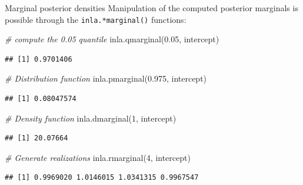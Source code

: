 \documentclass[
  ignorenonframetext,
]{beamer}
\newenvironment{Shaded}{\begin{snugshade}}{\end{snugshade}}
\newcommand{\CommentTok}[1]{\textcolor[rgb]{0.56,0.35,0.01}{\textit{#1}}}
\newcommand{\DecValTok}[1]{\textcolor[rgb]{0.00,0.00,0.81}{#1}}
\newcommand{\FloatTok}[1]{\textcolor[rgb]{0.00,0.00,0.81}{#1}}
\newcommand{\FunctionTok}[1]{\textcolor[rgb]{0.00,0.00,0.00}{#1}}
\newcommand{\NormalTok}[1]{#1}
\begin{document}
\begin{frame}[fragile]{Marginal posterior densities}
\protect\hypertarget{marginal-posterior-densities-2}{}
Manipulation of the computed posterior marginals is possible through the
\texttt{inla.*marginal()} functions:

\small

\begin{Shaded}
\begin{Highlighting}[]
\CommentTok{\# compute the 0.05 quantile}
\FunctionTok{inla.qmarginal}\NormalTok{(}\FloatTok{0.05}\NormalTok{, intercept)}
\end{Highlighting}
\end{Shaded}

\begin{verbatim}
## [1] 0.9701406
\end{verbatim}

\begin{Shaded}
\begin{Highlighting}[]
\CommentTok{\# Distribution function}
\FunctionTok{inla.pmarginal}\NormalTok{(}\FloatTok{0.975}\NormalTok{, intercept)}
\end{Highlighting}
\end{Shaded}

\begin{verbatim}
## [1] 0.08047574
\end{verbatim}

\begin{Shaded}
\begin{Highlighting}[]
\CommentTok{\# Density function}
\FunctionTok{inla.dmarginal}\NormalTok{(}\DecValTok{1}\NormalTok{, intercept)}
\end{Highlighting}
\end{Shaded}

\begin{verbatim}
## [1] 20.07664
\end{verbatim}

\begin{Shaded}
\begin{Highlighting}[]
\CommentTok{\# Generate realizations}
\FunctionTok{inla.rmarginal}\NormalTok{(}\DecValTok{4}\NormalTok{, intercept)}
\end{Highlighting}
\end{Shaded}

\begin{verbatim}
## [1] 0.9969020 1.0146015 1.0341315 0.9967547
\end{verbatim}

\normalsize
\end{frame}
\end{document}
